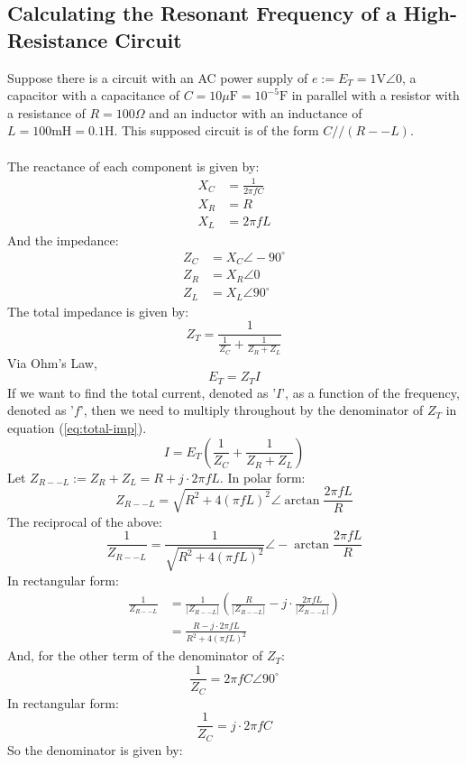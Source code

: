 \documentclass{article}
\begin{document}
	\subsection[High-Res]{Calculating the Resonant Frequency of a 
	High-Resistance Circuit}
	Suppose there is a circuit with an AC power supply of 
	$e:=E_T=1\text{V}\angle0$, a capacitor with a capacitance of 
	$C=10\mu\text{F}=10^{-5}\text{F}$ in parallel with a resistor with a 
	resistance of $R=100\Omega$ and an inductor with an inductance of 
	$L=100\text{mH}=0.1\text{H}$.  This supposed circuit is of the form 
	$C//(R--L)$.\\ \\
	The reactance of each component is given by:
	\begin{align*}
		X_C &= \frac{1}{2\pi f C} \\
		X_R &= R \\
		X_L &= 2\pi f L
	\end{align*}
	And the impedance:
	\begin{align*}
		Z_C &= X_C \angle-90^{\circ} \\
		Z_R &= X_R \angle 0 \\
		Z_L &= X_L \angle 90^{\circ}
	\end{align*}
	The total impedance is given by:
	\begin{equation}\label{eq:total-imp}
		Z_T = \frac{1}{\frac{1}{Z_C}+\frac{1}{Z_R+Z_L}}
	\end{equation}
	Via Ohm's Law,
	$$ E_T = Z_TI$$
	If we want to find the total current, denoted as '$I$', as a function of 
	the frequency, denoted as '$f$', then we need to multiply throughout by the 
	denominator of $Z_T$ in equation (\ref{eq:total-imp}).
	$$ I = E_T\left(\frac{1}{Z_C} + \frac{1}{Z_R+Z_L}\right)$$
	Let $Z_{R--L}:=Z_R + Z_L=R + j \cdot 2\pi f L$.  In polar form:
	$$ Z_{R--L} = \sqrt{R^2 + 4(\pi f L)^2}\angle \arctan \frac{2 \pi f L}{R}$$
	The reciprocal of the above:
	$$ \frac{1}{Z_{R--L}}=\frac{1}{\sqrt{R^2 + 4(\pi f L)^2}}\angle-\arctan 
	\frac{2 \pi f L}{R}$$
	In rectangular form:
	\begin{align*}
		\frac{1}{Z_{R--L}} &= 
		\frac{1}{|Z_{R--L}|}\left(\frac{R}{|Z_{R--L}|} - j\cdot\frac{2\pi f 
		L}{|Z_{R--L}|}\right) \\
		 &= \frac{R-j\cdot 2\pi f L}{R^2 + 4(\pi f L)^2}
	\end{align*}
	And, for the other term of the denominator of $Z_T$:
	$$ \frac{1}{Z_C} = 2\pi f C \angle 90^{\circ}$$
	In rectangular form:
	$$ \frac{1}{Z_C} = j \cdot 2\pi f C$$
	So the denominator is given by:
\end{document}
